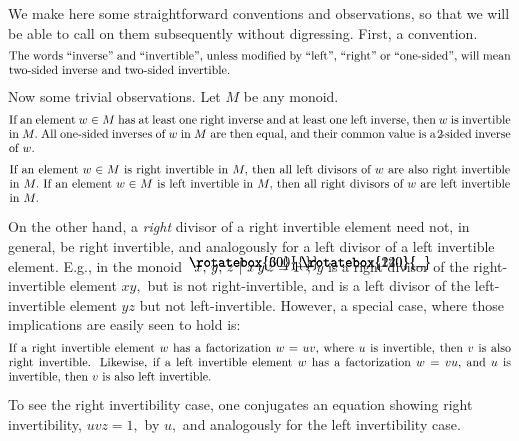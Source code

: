 \documentclass{amsart}
\numberwithin{equation}{section}
\newcommand{\langl}{\begin{picture}(.51em,1em)
\put(.11em,.33em){\rotatebox{60}{\line(1,0){.55em}}}
\put(.11em,.33em){\rotatebox{300}{\line(1,0){.55em}}}
\end{picture}}
\newcommand{\rangl}{\begin{picture}(.5em,1em)
\put(.09em,.33em){\rotatebox{120}{\line(1,0){.55em}}}
\put(.09em,.33em){\rotatebox{240}{\line(1,0){.55em}}}
\end{picture}}
\begin{document}
We make here some straightforward
conventions and observations, so that
we will be able to call on them subsequently without digressing.
First, a convention.\vspace{.3em}
%
\begin{equation}\begin{minipage}[c]{35pc}\label{d.inv}
The words ``inverse'' and ``invertible'', unless modified by
``left'', ``right'' or ``one-sided'', will mean two-sided inverse
and two-sided invertible.\vspace{.35em}
\end{minipage}\end{equation}
%
Now some trivial observations.
Let $M$ be any monoid.\vspace{.3em}
%
\begin{equation}\begin{minipage}[c]{35pc}\label{d.rt+l}
If an element $w \in  M$ has at least one right inverse and
at least one left inverse, then $w$ is invertible in $M.$
All one-sided inverses of $w$ in $M$ are then equal,
and their common value is a $\!2\!$-sided inverse of $w.$\vspace{.35em}
\end{minipage}\end{equation}
%
\begin{equation}\begin{minipage}[c]{35pc}\label{d.div-1-sided_inv}
If an element $w \in M$ is right invertible in $M,$ then all left
divisors of $w$ are also right invertible in $M.$
If an element $w \in M$ is left invertible in $M,$ then all right
divisors of $w$ are left invertible in~$M.$
\end{minipage}\end{equation}\vspace{0em}

On the other hand, a {\em right} divisor of a right invertible
element need not, in general, be right invertible, and analogously
for a left divisor of a left invertible element.
E.g., in the monoid $\langl x,\,y,\,z~|~x\,y\,z=1\rangl,$
$y$ is a right divisor of the right-invertible
element $xy,$ but is not right-invertible,
and is a left divisor of the left-invertible
element $yz$ but not left-invertible.
However, a special case, where those implications are easily seen
to hold is:\vspace{.3em}
%
\begin{equation}\begin{minipage}[c]{35pc}\label{d.pull_unit_fr_1-sided}
If a right invertible element $w$ has a factorization
$w = uv,$ where $u$ is invertible, then $v$ is also right invertible.
Likewise, if a left invertible element $w$ has a factorization $w = vu,$
and $u$ is invertible, then $v$ is also left invertible.\vspace{.3em}
\end{minipage}\end{equation}
%
To see the right invertibility case, one conjugates an equation showing
right invertibility,
$uvz=1,$ by $u,$ and analogously for the left invertibility case.
\end{document}
